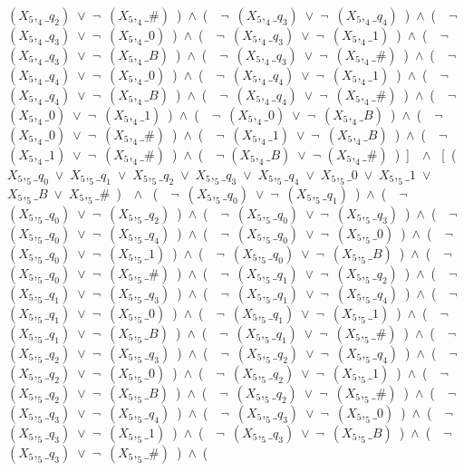 ﻿\documentclass[a4paper,10pt]{article}
\begin{document}
$(X_5,_4\_q_2)$\ $\vee$\ $\neg$\ $(X_5,_4\_\#)$\ )\ $\wedge$\ (\ \ $\neg$\ $(X_5,_4\_q_3)$\ $\vee$\ $\neg$\ $(X_5,_4\_q_4)$\ )\ $\wedge$\ (\ \ $\neg$\ $(X_5,_4\_q_3)$\ $\vee$\ $\neg$\ $(X_5,_4\_0)$\ )\ $\wedge$\ (\ \ $\neg$\ $(X_5,_4\_q_3)$\ $\vee$\ $\neg$\ $(X_5,_4\_1)$\ )\ $\wedge$\ (\ \ $\neg$\ $(X_5,_4\_q_3)$\ $\vee$\ $\neg$\ $(X_5,_4\_B)$\ )\ $\wedge$\ (\ \ $\neg$\ $(X_5,_4\_q_3)$\ $\vee$\ $\neg$\ $(X_5,_4\_\#)$\ )\ $\wedge$\ (\ \ $\neg$\ $(X_5,_4\_q_4)$\ $\vee$\ $\neg$\ $(X_5,_4\_0)$\ )\ $\wedge$\ (\ \ $\neg$\ $(X_5,_4\_q_4)$\ $\vee$\ $\neg$\ $(X_5,_4\_1)$\ )\ $\wedge$\ (\ \ $\neg$\ $(X_5,_4\_q_4)$\ $\vee$\ $\neg$\ $(X_5,_4\_B)$\ )\ $\wedge$\ (\ \ $\neg$\ $(X_5,_4\_q_4)$\ $\vee$\ $\neg$\ $(X_5,_4\_\#)$\ )\ $\wedge$\ (\ \ $\neg$\ $(X_5,_4\_0)$\ $\vee$\ $\neg$\ $(X_5,_4\_1)$\ )\ $\wedge$\ (\ \ $\neg$\ $(X_5,_4\_0)$\ $\vee$\ $\neg$\ $(X_5,_4\_B)$\ )\ $\wedge$\ (\ \ $\neg$\ $(X_5,_4\_0)$\ $\vee$\ $\neg$\ $(X_5,_4\_\#)$\ )\ $\wedge$\ (\ \ $\neg$\ $(X_5,_4\_1)$\ $\vee$\ $\neg$\ $(X_5,_4\_B)$\ )\ $\wedge$\ (\ \ $\neg$\ $(X_5,_4\_1)$\ $\vee$\ $\neg$\ $(X_5,_4\_\#)$\ )\ $\wedge$\ (\ \ $\neg$ $(X_5,_4\_B)$\ $\vee$\ $\neg$ $(X_5,_4\_\#)$\ )\ ]\ \ $\wedge$ \ [\ (\ $X_5,_5\_q_0$\ $\vee$\ $X_5,_5\_q_1$\ $\vee$\ $X_5,_5\_q_2$\ $\vee$\ $X_5,_5\_q_3$\ $\vee$\ $X_5,_5\_q_4$\ $\vee$\ $X_5,_5\_0$\ $\vee$\ $X_5,_5\_1$\ $\vee$\ $X_5,_5\_B$\ $\vee$\ $X_5,_5\_\#$\ )\ \ $\wedge$ \ (\ \ $\neg$\ $(X_5,_5\_q_0)$\ $\vee$\ $\neg$\ $(X_5,_5\_q_1)$\ )\ $\wedge$\ (\ \ $\neg$\ $(X_5,_5\_q_0)$\ $\vee$\ $\neg$\ $(X_5,_5\_q_2)$\ )\ $\wedge$\ (\ \ $\neg$\ $(X_5,_5\_q_0)$\ $\vee$\ $\neg$\ $(X_5,_5\_q_3)$\ )\ $\wedge$\ (\ \ $\neg$\ $(X_5,_5\_q_0)$\ $\vee$\ $\neg$\ $(X_5,_5\_q_4)$\ )\ $\wedge$\ (\ \ $\neg$\ $(X_5,_5\_q_0)$\ $\vee$\ $\neg$\ $(X_5,_5\_0)$\ )\ $\wedge$\ (\ \ $\neg$\ $(X_5,_5\_q_0)$\ $\vee$\ $\neg$\ $(X_5,_5\_1)$\ )\ $\wedge$\ (\ \ $\neg$\ $(X_5,_5\_q_0)$\ $\vee$\ $\neg$\ $(X_5,_5\_B)$\ )\ $\wedge$\ (\ \ $\neg$\ $(X_5,_5\_q_0)$\ $\vee$\ $\neg$\ $(X_5,_5\_\#)$\ )\ $\wedge$\ (\ \ $\neg$\ $(X_5,_5\_q_1)$\ $\vee$\ $\neg$\ $(X_5,_5\_q_2)$\ )\ $\wedge$\ (\ \ $\neg$\ $(X_5,_5\_q_1)$\ $\vee$\ $\neg$\ $(X_5,_5\_q_3)$\ )\ $\wedge$\ (\ \ $\neg$\ $(X_5,_5\_q_1)$\ $\vee$\ $\neg$\ $(X_5,_5\_q_4)$\ )\ $\wedge$\ (\ \ $\neg$\ $(X_5,_5\_q_1)$\ $\vee$\ $\neg$\ $(X_5,_5\_0)$\ )\ $\wedge$\ (\ \ $\neg$\ $(X_5,_5\_q_1)$\ $\vee$\ $\neg$\ $(X_5,_5\_1)$\ )\ $\wedge$\ (\ \ $\neg$\ $(X_5,_5\_q_1)$\ $\vee$\ $\neg$\ $(X_5,_5\_B)$\ )\ $\wedge$\ (\ \ $\neg$\ $(X_5,_5\_q_1)$\ $\vee$\ $\neg$\ $(X_5,_5\_\#)$\ )\ $\wedge$\ (\ \ $\neg$\ $(X_5,_5\_q_2)$\ $\vee$\ $\neg$\ $(X_5,_5\_q_3)$\ )\ $\wedge$\ (\ \ $\neg$\ $(X_5,_5\_q_2)$\ $\vee$\ $\neg$\ $(X_5,_5\_q_4)$\ )\ $\wedge$\ (\ \ $\neg$\ $(X_5,_5\_q_2)$\ $\vee$\ $\neg$\ $(X_5,_5\_0)$\ )\ $\wedge$\ (\ \ $\neg$\ $(X_5,_5\_q_2)$\ $\vee$\ $\neg$\ $(X_5,_5\_1)$\ )\ $\wedge$\ (\ \ $\neg$\ $(X_5,_5\_q_2)$\ $\vee$\ $\neg$\ $(X_5,_5\_B)$\ )\ $\wedge$\ (\ \ $\neg$\ $(X_5,_5\_q_2)$\ $\vee$\ $\neg$\ $(X_5,_5\_\#)$\ )\ $\wedge$\ (\ \ $\neg$\ $(X_5,_5\_q_3)$\ $\vee$\ $\neg$\ $(X_5,_5\_q_4)$\ )\ $\wedge$\ (\ \ $\neg$\ $(X_5,_5\_q_3)$\ $\vee$\ $\neg$\ $(X_5,_5\_0)$\ )\ $\wedge$\ (\ \ $\neg$\ $(X_5,_5\_q_3)$\ $\vee$\ $\neg$\ $(X_5,_5\_1)$\ )\ $\wedge$\ (\ \ $\neg$\ $(X_5,_5\_q_3)$\ $\vee$\ $\neg$\ $(X_5,_5\_B)$\ )\ $\wedge$\ (\ \ $\neg$\ $(X_5,_5\_q_3)$\ $\vee$\ $\neg$\ $(X_5,_5\_\#)$\ )\ $\wedge$\ (\ 
\end{document}
